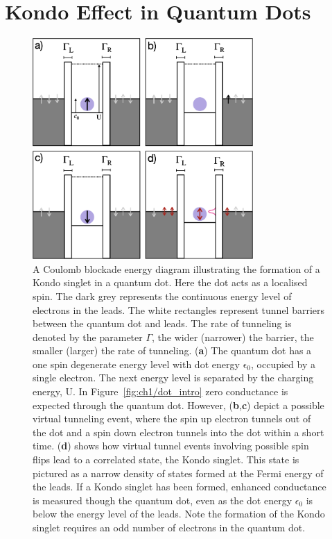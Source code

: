 \afterpage{\clearpage}
\section{Kondo Effect in Quantum Dots}

\begin{figure}[!hbt]
  \begin{center}
    \includegraphics[width=0.75\textwidth]{figures/ch2/crop_FiguresMaster.010.png}
    \caption[Kondo effect in a quantum dot: Coulomb blockade energy diagrams]{\label{fig:ch2/kondo_dot_diagram} 
    A Coulomb blockade energy diagram illustrating the formation of a Kondo singlet in a quantum dot. Here the dot acts as a localised spin. The dark grey represents the continuous energy level of electrons in the leads. The white rectangles represent tunnel barriers between the quantum dot and leads. The rate of tunneling is denoted by the parameter $\Gamma$, the wider (narrower) the barrier, the smaller (larger) the rate of tunneling. (\textbf{a}) The quantum dot has a one spin degenerate energy level with dot energy $\mathrm{\epsilon_0}$, occupied by a single electron. The next energy level is separated by the charging energy, $\mathrm{U}$. In Figure~\ref{fig:ch1/dot_intro} zero conductance is expected through the quantum dot. However, (\textbf{b},\textbf{c}) depict a possible virtual tunneling event, where the spin up electron tunnels out of the dot and a spin down electron tunnels into the dot within a short time. (\textbf{d}) shows how virtual tunnel events involving possible spin flips lead to a correlated state, the Kondo singlet. This state is pictured as a narrow density of states formed at the Fermi energy of the leads. If a Kondo singlet has been formed, enhanced conductance is measured though the quantum dot, even as the dot energy $\epsilon_0$ is below the energy level of the leads. Note the formation of the Kondo singlet requires an odd number of electrons in the quantum dot.
      }
  \end{center}
\end{figure}


